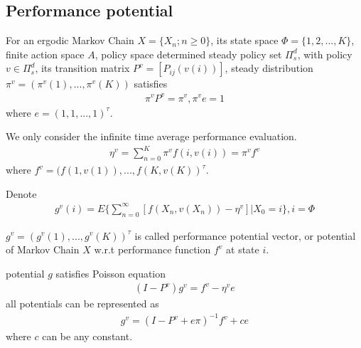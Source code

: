 \documentclass[runningheads]{llncs}
\begin{document}
    \subsection{Performance potential}
    For an ergodic Markov Chain $X = \{ X_n; n \geq 0 \}$, its state space $\Phi = \{ 1, 2,..., K \}$,
    finite action space $A$, policy space determined steady policy set $\Pi_s^d$,
    with policy $v \in \Pi_s^d$, its transition matrix $P^v = [P_{ij}(v(i))]$,
    steady distribution $\pi^v = (\pi^v(1),..., \pi^v(K))$ satisfies
    \begin{align}
        \pi^v P^v = \pi^v, \pi^v e = 1
    \end{align}
    where $e = (1, 1,..., 1)^\tau$.
    \par
    We only consider the infinite time average performance evaluation.
    \begin{align}
        \eta^v = \sum_{n=0}^K \pi^v f(i, v(i)) = \pi^v f^v
    \end{align}
    where $f^v = (f(1, v(1)),...,f(K, v(K))^\tau$.
    \par
    Denote 
    \begin{align}
        g^v(i) = E \{ \sum_{n=0}^\infty [f(X_n, v(X_n)) - \eta^v] | X_0 = i \}, i = \Phi
    \end{align}
    \begin{definition}
        $g^v = (g^v(1),..., g^v(K))^\tau$ is called performance potential vector,
    or potential of Markov Chain $X$ w.r.t performance function $f^v$ at state $i$.
    \end{definition} 
    \begin{lemma}
    potential $g$ satisfies Poisson equation
    \begin{align}
        (I - P^v)g^v = f^v - \eta^v e
    \end{align}
    all potentials can be represented as 
    \begin{align}
        g^v = (I - P^v + e \pi)^{-1} f^v + ce
    \end{align}
    where $c$ can be any constant.
    \end{lemma}
\end{document}
